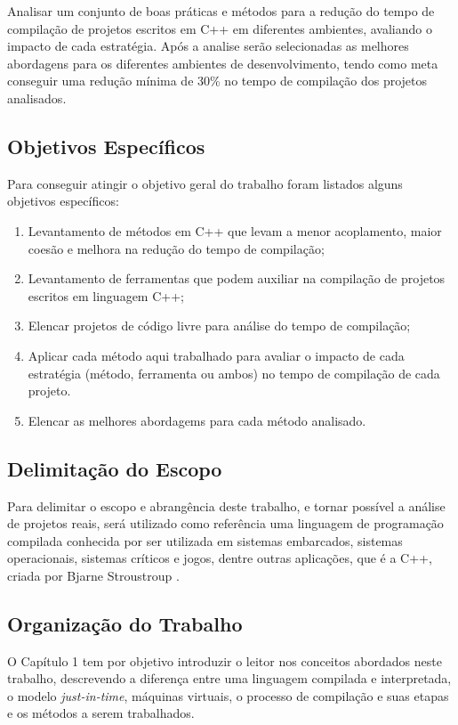 Analisar um conjunto de boas práticas e métodos para a redução do
 tempo de compilação de projetos escritos em C++ em diferentes ambientes,
 avaliando o impacto de cada estratégia.
 Após a analise serão selecionadas as melhores abordagens
 para os diferentes ambientes de desenvolvimento, tendo como meta conseguir uma
 redução mínima de 30\% no tempo de compilação dos projetos analisados. 

\subsection*{Objetivos Específicos}

Para conseguir atingir o objetivo geral do trabalho foram listados
 alguns objetivos específicos:

\begin{enumerate}
    \item Levantamento de métodos em C++ que levam a menor acoplamento,
 maior coesão e melhora na redução do tempo de compilação;
    \item Levantamento de ferramentas que podem auxiliar na compilação
 de projetos escritos em linguagem C++;
    \item Elencar projetos de código livre para análise do tempo de
 compilação;
    \item Aplicar cada método aqui trabalhado para avaliar o impacto de cada
 estratégia (método, ferramenta ou ambos) no tempo de compilação de
 cada projeto.
    \item Elencar as melhores abordagems para cada método analisado.
\end{enumerate}


\subsection*{Delimitação do Escopo}

Para delimitar o escopo e abrangência deste trabalho, e tornar possível
 a análise de projetos reais, será utilizado como referência uma linguagem
 de programação compilada conhecida por ser utilizada em sistemas embarcados,
 sistemas operacionais, sistemas críticos e jogos, dentre outras aplicações,
 que é a C++, criada por Bjarne Stroustroup \cite{BjarneC++}.

\subsection*{Organização do Trabalho}

O Capítulo 1 tem por objetivo introduzir o leitor nos conceitos abordados
 neste trabalho, descrevendo a diferença entre uma linguagem compilada e
 interpretada, o modelo \textit{just-in-time}, máquinas virtuais, o processo de compilação
 e suas etapas e os métodos a serem trabalhados.

